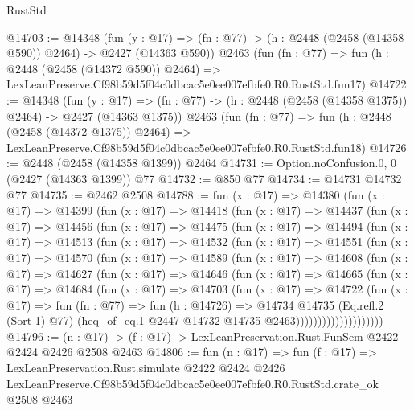 \begin{lexlean}{RustStd}
\begin{coremodule}
@14703 := @14348
    (fun (y : @17) => (fn : @77) -> (h : @2448 (@2458 (@14358 @590)) @2464) -> @2427 (@14363 @590))
    @2463
    (fun (fn : @77) =>
    fun (h : @2448 (@2458 (@14372 @590)) @2464) =>
    LexLeanPreserve.Cf98b59d5f04c0dbcac5e0ee007efbfe0.R0.RustStd.fun17)
@14722 := @14348
    (fun (y : @17) =>
    (fn : @77) -> (h : @2448 (@2458 (@14358 @1375)) @2464) -> @2427 (@14363 @1375))
    @2463
    (fun (fn : @77) =>
    fun (h : @2448 (@2458 (@14372 @1375)) @2464) =>
    LexLeanPreserve.Cf98b59d5f04c0dbcac5e0ee007efbfe0.R0.RustStd.fun18)
@14726 := @2448 (@2458 (@14358 @1399)) @2464
@14731 := Option.noConfusion.{0, 0} (@2427 (@14363 @1399)) @77
@14732 := @850 @77
@14734 := @14731 @14732 @77
@14735 := @2462 @2508
@14788 := fun (x : @17) =>
  @14380
    (fun (x : @17) =>
    @14399
      (fun (x : @17) =>
      @14418
        (fun (x : @17) =>
        @14437
          (fun (x : @17) =>
          @14456
            (fun (x : @17) =>
            @14475
              (fun (x : @17) =>
              @14494
                (fun (x : @17) =>
                @14513
                  (fun (x : @17) =>
                  @14532
                    (fun (x : @17) =>
                    @14551
                      (fun (x : @17) =>
                      @14570
                        (fun (x : @17) =>
                        @14589
                          (fun (x : @17) =>
                          @14608
                            (fun (x : @17) =>
                            @14627
                              (fun (x : @17) =>
                              @14646
                                (fun (x : @17) =>
                                @14665
                                  (fun (x : @17) =>
                                  @14684
                                    (fun (x : @17) =>
                                    @14703
                                      (fun (x : @17) =>
                                      @14722
                                        (fun (x : @17) =>
                                        fun (fn : @77) =>
                                        fun (h : @14726) =>
                                        @14734
                                          @14735
                                          (Eq.refl.{2} (Sort 1) @77)
                                          (heq_of_eq.{1}
                                            @2447
                                            @14732
                                            @14735
                                            @2463))))))))))))))))))))
@14796 := (n : @17) -> (f : @17) -> LexLeanPreservation.Rust.FunSem @2422 @2424 @2426 @2508 @2463
@14806 := fun (n : @17) =>
  fun (f : @17) =>
  LexLeanPreservation.Rust.simulate
    @2422
    @2424
    @2426
    LexLeanPreserve.Cf98b59d5f04c0dbcac5e0ee007efbfe0.R0.RustStd.crate_ok
    @2508
    @2463
\end{coremodule}
\end{lexlean}
